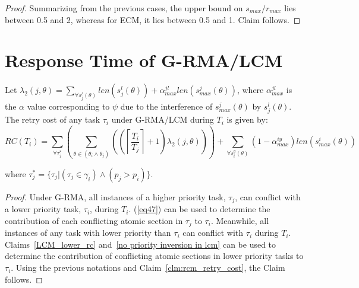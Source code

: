 \begin{proof}
Summarizing from the previous cases, the upper bound on $s_{max}/r_{max}$
lies between 0.5 and 2, whereas for ECM,
it lies between 0.5 and 1. Claim follows.

\end{proof}

\section{Response Time of G-RMA/LCM}
\label{rma}

\begin{clm}\label{response g-rma/lcm}
Let $\lambda_{2}(j,\theta)=\sum_{\forall s_{j}^{l}(\theta)}len(s_{j}^{l}(\theta))+\alpha_{max}^{jl}len(s_{max}^{j}(\theta))$, where $\alpha_{max}^{jl}$ is the $\alpha$ value corresponding to $\psi$ due to the interference of $s_{max}^j(\theta)$ by $s_j^l(\theta)$. The retry cost of any task $\tau_i$ under G-RMA/LCM during $T_i$ 
is given by:
\begin{equation}
RC\left(T_i\right) = \sum_{\forall\tau_{j}^{*}}\left(\sum_{\theta\in(\theta_{i}\wedge\theta_{j})}\left(\left(\left\lceil\frac{T_i}{T_{j}}\right\rceil +1\right)\lambda_{2}(j,\theta)\right)\right) + \sum_{\forall s_{i}^{y}(\theta)}\left(1-\alpha_{max}^{iy}\right)len\left(s_{max}^i(\theta)\right)
\label{eq60}
\end{equation}

where $\tau_{j}^{*}=\{\tau_{j}|(\tau_{j}\in\gamma_{i})\wedge(p_{j}>p_{i})\}$.
\end{clm}

\begin{proof}\normalfont
Under G-RMA, all instances of a higher priority task, $\tau_{j}$, can conflict with a lower priority task,
$\tau_{i}$, during $T_{i}$. (\ref{eq47}) can be used to determine the contribution of each conflicting atomic section in $\tau_j$ to $\tau_i$. Meanwhile, all instances of any task with lower priority than $\tau_{i}$ can conflict with $\tau_i$ during $T_{i}$. Claims~\ref{LCM_lower_rc} and~\ref{no priority inversion in lcm} can be used to determine the contribution of conflicting atomic sections in lower priority tasks to $\tau_i$.
%
Using the previous notations and Claim~\ref{clm:rcm_retry_cost}, the Claim follows.
\end{proof}


